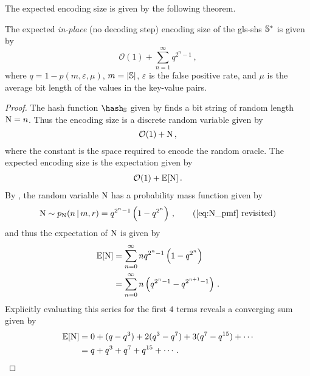 \documentclass[ ../main.tex]{subfiles}
\begin{document}
The expected encoding size is given by the following theorem.
\begin{theorem}
\label{thm:open_expect}
The expected \emph{in-place} (no decoding step) encoding size of the \gls{gls-shs} $\mathbb{S}^*$ is given by
\begin{equation}
    \mathcal{O}(1) + \sum_{n=1}^{\infty} q^{2^n-1}\,,
\end{equation}
where $q=1 - p(m,\varepsilon,\mu)$, $m = \left\vert{\mathbb{S}}\right\vert$, $\varepsilon$ is the false positive rate, and $\mu$ is the average bit length of the values in the key-value pairs.
\end{theorem}
\begin{proof}
The hash function $\hash_{\St}$ given by  finds a bit string of random length $\mathrm{N} = n$. Thus the encoding size is a discrete random variable given by
\begin{equation}
    \mathcal{O}(1) + \mathrm{N}\,,
\end{equation}
where the constant is the space required to encode the random oracle. The expected encoding size is the expectation given by
\begin{align}
    \mathcal{O}(1) + \operatorname{\mathbb{E}}[\mathrm{N}]\,.
\end{align}
By , the random variable $\mathrm{N}$ has a probability mass function given by
\begin{equation*}
    \rv{N} \sim \pmf_{\rv{N}}(n \given m,r) = q^{2^n-1}\left(1 - q^{2^n}\right)\,,
    \tag{\ref{eq:N_pmf} revisited}
\end{equation*}
and thus the expectation of $\mathrm{N}$ is given by
\begin{align}
    \operatorname{\mathbb{E}}\!\left[\mathrm{N}\right]
    &= \sum_{n=0}^{\infty} n q^{2^n-1}\left(1 - q^{2^n}\right)\\
    &= \sum_{n=0}^{\infty} n \left(q^{2^n-1} - q^{2^{n+1}-1}\right)\,.
\end{align}
Explicitly evaluating this series for the first $4$ terms reveals a converging sum given by
\begin{align}
    \operatorname{\mathbb{E}}\!\left[\mathrm{N}\right]
        &= 0 + (q - q^3) + 2(q^3 - q^7) + 3(q^7 - q^{15}) + \cdots\\
        &= q + q^3 + q^7 + q^{15} + \cdots\,.
\end{align}
\end{proof}
\end{document}
